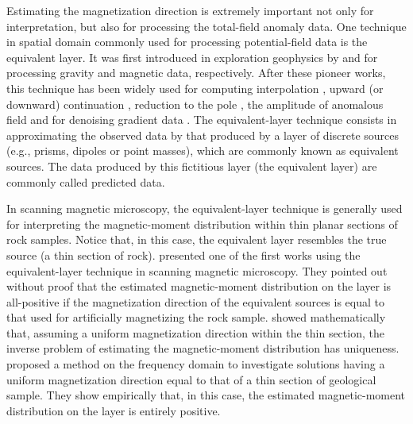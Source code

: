 Estimating the magnetization direction is extremely important not only for interpretation, 
but also for processing the total-field anomaly data. One technique in spatial domain 
commonly used for processing potential-field data is the equivalent layer. It was first introduced 
in exploration geophysics by \cite{dampney1969} and \cite{emilia_massey_1974} for processing 
gravity and magnetic data, respectively. After these pioneer works, this technique has been widely 
used for computing interpolation \citep{cordell_1992, mendonca-silva_1994, barnes-lumley_2011, siqueira_etal_2017}, 
upward (or downward) continuation  \citep{hansen-miyazaki_1984, li-oldenburg_2010}, reduction to the pole 
\citep{silva_1986, leao-silva_1989, guspi-novara_2009, oliveirajr-etal_2013}, the amplitude of 
anomalous field \citep{li_li_2014} and for denoising gradient data \citep{martinez_li_2016}. 
The equivalent-layer technique consists in approximating the observed data by that produced by a 
layer of discrete sources (e.g., prisms, dipoles or point masses), which are commonly known as 
equivalent sources. The data produced by this fictitious layer (the equivalent layer) are commonly
called predicted data.

In scanning magnetic microscopy, the equivalent-layer technique is generally used for interpreting 
the magnetic-moment distribution within thin planar sections of rock samples. Notice that, in this case, 
the equivalent layer resembles the true source (a thin section of rock). 
\cite{weiss2007} presented one of the first works using the equivalent-layer technique in scanning magnetic microscopy.
They pointed out without proof that the estimated magnetic-moment distribution on the layer is all-positive if 
the magnetization direction of the equivalent sources is equal to that used for artificially magnetizing the rock sample. 
\cite{baratchart2013} showed mathematically that, assuming a uniform magnetization direction within the thin section, 
the inverse problem of estimating the magnetic-moment distribution has uniqueness. 
\cite{lima2013} proposed a method on the frequency domain to investigate solutions having a uniform magnetization 
direction equal to that of a thin section of geological sample. They show empirically 
that, in this case, the estimated magnetic-moment distribution on the layer is entirely positive. 

